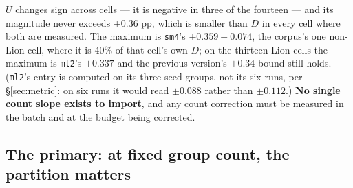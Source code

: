 \documentclass[10pt,letterpaper]{article}
\newcommand{\Dstat}{D}                         %
\newcommand{\Ustat}{U}                         %
\newcommand{\arm}[1]{\texttt{#1}}
\begin{document}
$\Ustat$ changes sign across cells --- it is negative in three of the fourteen --- and its
magnitude never exceeds $+0.36$ pp, which is smaller than
$\Dstat$ in every cell where both are measured. The maximum is \arm{sm4}'s $+0.359 \pm 0.074$, the
corpus's one non-Lion cell, where it is 40\% of that cell's own $\Dstat$; on the thirteen Lion
cells the maximum is \arm{ml2}'s $+0.337$ and the previous version's $+0.34$ bound still holds.
(\arm{ml2}'s entry is computed on its three seed groups, not its six runs, per
\S\ref{sec:metric}: on six runs it would read $\pm 0.088$ rather than $\pm 0.112$.) \textbf{No single count slope exists to
import}, and any count correction must be measured in the batch and at the budget being
corrected.

\subsection{The primary: at fixed group count, the partition matters}
\label{sec:primary}
\end{document}

